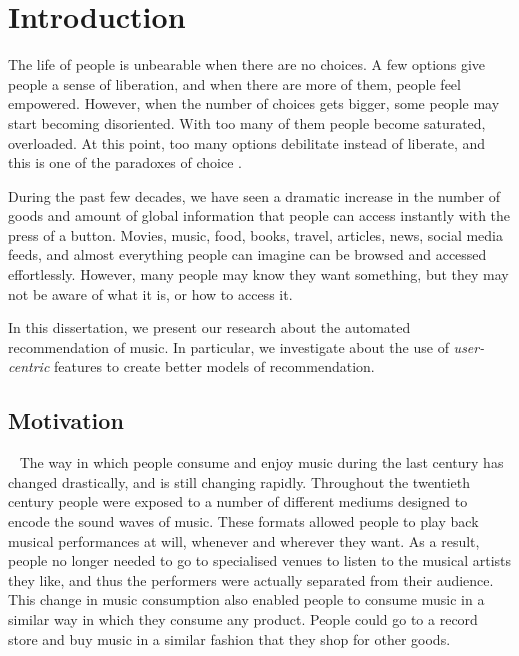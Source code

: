 
\chapter{Introduction}\label{ch:1-introduction}
The life of people is unbearable when there are no choices. A few options give people a sense of liberation, and when there are more of them, people feel empowered. However, when the number of choices gets bigger, some people may start becoming disoriented. With too many of them people become saturated, overloaded. At this point, too many options debilitate instead of liberate, and this is one of the paradoxes of choice \autocite{schwartz04paradox}.

During the past few decades, we have seen a dramatic increase in the number of goods and amount of global information that people can access instantly with the press of a button. 
Movies, music, food, books, travel, articles, news, social media feeds, and almost everything people can imagine can be browsed and accessed effortlessly. 
However, many people may know they want something, but they may not be aware of what it is, or how to access it.

In this dissertation, we present our research about the automated recommendation of music. In particular, we investigate about the use of \textit{user-centric} features to create better models of recommendation. 

\section{Motivation}~\label{sec:motivation}
The way in which people consume and enjoy music during the last century has changed drastically, and is still changing rapidly. Throughout the twentieth century people were exposed to a number of different mediums designed to encode the sound waves of music. These formats allowed people to play back musical performances at will, whenever and wherever they want.
As a result, people no longer needed to go to specialised venues to listen to the musical artists they like, and thus the  performers were actually separated from their audience.
This change in music consumption also enabled people to consume music in a similar way in which they consume any product. People could go to a record store and buy music in a similar fashion that they shop for other goods.

